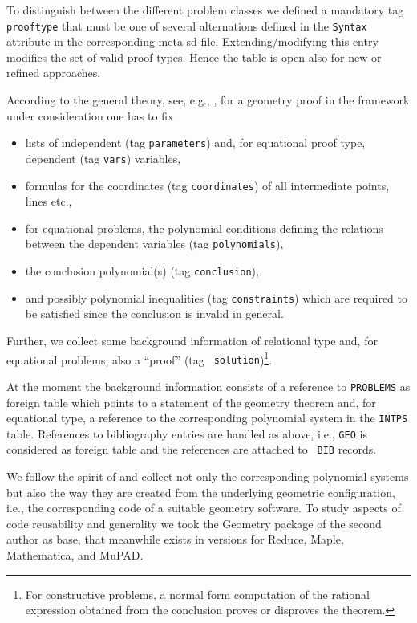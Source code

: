 \documentclass[11pt,a4paper]{article}
\begin{document}
To distinguish between the different problem classes we defined a
mandatory tag {\tt prooftype} that must be one of several alternations
defined in the {\tt Syntax} attribute in the corresponding meta
sd-file.  Extending/modifying this entry modifies the set of valid
proof types. Hence the table is open also for new or refined
approaches.

According to the general theory, see, e.g., \cite{Chou_88a}, for a
geometry proof in the framework under consideration one has to fix
\begin{itemize}
\item lists of independent (tag {\tt parameters}) and, for equational
proof type, dependent (tag {\tt vars}) variables,
\item formulas for the coordinates (tag {\tt coordinates}) of all
intermediate points, lines etc.,
\item for equational problems, the polynomial conditions defining the
relations between the dependent variables (tag {\tt polynomials}),
\item the conclusion polynomial(s) (tag {\tt conclusion}),
\item and possibly polynomial inequalities (tag {\tt constraints})
which are required to be satisfied since the conclusion is invalid in
general.
\end{itemize}
Further, we collect some background information of relational type
and, for equational problems, also a ``proof'' (tag {\tt
solution})\footnote{For constructive problems, a normal form
computation of the rational expression obtained from the conclusion
proves or disproves the theorem.}.

At the moment the background information consists of a reference to
{\tt PROBLEMS} as foreign table which points to a statement of the
geometry theorem and, for equational type, a reference to the
corresponding polynomial system in the {\tt INTPS} table.  References
to bibliography entries are handled as above, i.e., {\tt GEO} is
considered as foreign table and the references are attached to {\tt
BIB} records.

We follow the spirit of \cite{Chou_88a} and collect not only the
corresponding polynomial systems but also the way they are created
from the underlying geometric configuration, i.e., the corresponding
code of a suitable geometry software.  To study aspects of code
reusability and generality we took the {\sc Geometry} package
\cite{Graebe_98} of the second author as base, that meanwhile exists
in versions for {\sc Reduce}, {\sc Maple}, {\sc Mathematica}, and {\sc
MuPAD}.
\end{document}
